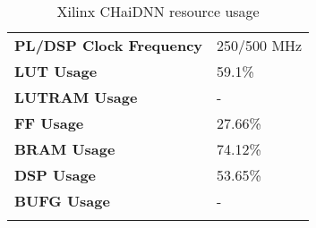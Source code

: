\begin{table}[H]
	\caption{Xilinx CHaiDNN resource usage}
	\label{tab:CHaiDNN-resource-usage}
	\centering
	\begin{tabular}{ll}
		\toprule
		\textbf{PL/DSP Clock Frequency} & 250/500 MHz\\
		\textbf{LUT Usage} & 59.1\%\\
		\textbf{LUTRAM Usage} & -\\
		\textbf{FF Usage} & 27.66\%\\
		\textbf{BRAM Usage} & 74.12\%\\
		\textbf{DSP Usage} & 53.65\%\\
		\textbf{BUFG Usage} & -\\
		\bottomrule\\
	\end{tabular}
\end{table}



